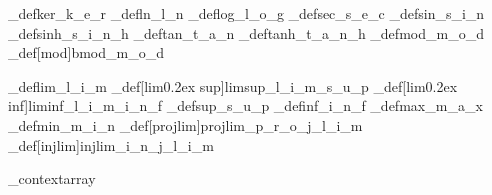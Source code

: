 \brl@char_def{ker}{\brl@char@alias_k\brl@char@alias_e\brl@char@alias_r}
\brl@char_def{ln}{\brl@char@alias_l\brl@char@alias_n}
\brl@char_def{log}{\brl@char@alias_l\brl@char@alias_o\brl@char@alias_g}
\brl@char_def{sec}{\brl@char@alias_s\brl@char@alias_e\brl@char@alias_c}
\brl@char_def{sin}{\brl@char@alias_s\brl@char@alias_i\brl@char@alias_n}
\brl@char_def{sinh}{\brl@char@alias_s\brl@char@alias_i\brl@char@alias_n\brl@char@alias_h}
\brl@char_def{tan}{\brl@char@alias_t\brl@char@alias_a\brl@char@alias_n}
\brl@char_def{tanh}{\brl@char@alias_t\brl@char@alias_a\brl@char@alias_n\brl@char@alias_h}
\brl@char_def{mod}{\brl@char@alias_m\brl@char@alias_o\brl@char@alias_d}
\brl@char_def[mod]{bmod}{\brl@char@alias_m\brl@char@alias_o\brl@char@alias_d}




\brl@char_def{lim}{\brl@char@alias_l\brl@char@alias_i\brl@char@alias_m}
\brl@char_def[lim\kern0.2ex sup]{limsup}{\brl@char@alias_l\brl@char@alias_i\brl@char@alias_m\brl@char@alias_s\brl@char@alias_u\brl@char@alias_p}
\brl@char_def[lim\kern0.2ex inf]{liminf}{\brl@char@alias_l\brl@char@alias_i\brl@char@alias_m\brl@char@alias_i\brl@char@alias_n\brl@char@alias_f}
\brl@char_def{sup}{\brl@char@alias_s\brl@char@alias_u\brl@char@alias_p}
\brl@char_def{inf}{\brl@char@alias_i\brl@char@alias_n\brl@char@alias_f}
\brl@char_def{max}{\brl@char@alias_m\brl@char@alias_a\brl@char@alias_x}
\brl@char_def{min}{\brl@char@alias_m\brl@char@alias_i\brl@char@alias_n}
\brl@char_def[proj\kern\p@ lim]{projlim}{\brl@char@alias_p\brl@char@alias_r\brl@char@alias_o\brl@char@alias_j\brl@char@alias_l\brl@char@alias_i\brl@char@alias_m}
\brl@char_def[inj\kern\p@ lim]{injlim}{\brl@char@alias_i\brl@char@alias_n\brl@char@alias_j\brl@char@alias_l\brl@char@alias_i\brl@char@alias_m}




\brl@char_context{array}




